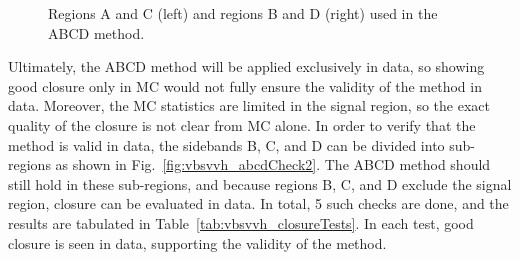 \begin{figure}[htb]
    \centering
    \qquad
    \caption[Regions A, B, C, and D used in the ABCD method]{
        Regions A and C (left) and regions B and D (right) used in the ABCD method.
    }
    \label{fig:vbsvvh_abcd_closureMass}
\end{figure}

Ultimately, the ABCD method will be applied exclusively in data, so showing good closure only in MC would not fully ensure the validity of the method in data. 
Moreover, the MC statistics are limited in the signal region, so the exact quality of the closure is not clear from MC alone. 
In order to verify that the method is valid in data, the sidebands B, C, and D can be divided into sub-regions as shown in Fig.~\ref{fig:vbsvvh_abcdCheck2}. 
The ABCD method should still hold in these sub-regions, and because regions B, C, and D exclude the signal region, closure can be evaluated in data. 
In total, 5 such checks are done, and the results are tabulated in Table~\ref{tab:vbsvvh_closureTests}. 
In each test, good closure is seen in data, supporting the validity of the method.

